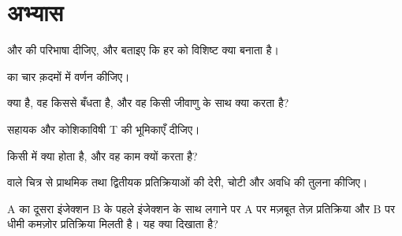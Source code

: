 \section{अभ्यास}

\begin{exercise}[$\star$]\label{exo:g12:adaptive-immunity:1}
 और  की परिभाषा दीजिए, और बताइए कि हर  को विशिष्ट क्या
बनाता है।
\end{exercise}

\begin{exercise}[$\star$]\label{exo:g12:adaptive-immunity:2}
 का चार क़दमों में वर्णन कीजिए।
\end{exercise}

\begin{exercise}[$\star$]\label{exo:g12:adaptive-immunity:3}
 क्या है, वह किससे बँधता है, और वह किसी जीवाणु के साथ क्या करता
है?
\end{exercise}

\begin{exercise}[$\star$]\label{exo:g12:adaptive-immunity:4}
सहायक और कोशिकाविषी T  की भूमिकाएँ दीजिए।
\end{exercise}

\begin{exercise}[$\star$]\label{exo:g12:adaptive-immunity:5}
किसी  में क्या होता है, और वह काम क्यों करता है?
\end{exercise}

\begin{exercise}[$\star\star$]\label{exo:g12:adaptive-immunity:6}
 वाले चित्र से प्राथमिक तथा द्वितीयक प्रतिक्रियाओं की देरी, चोटी
और अवधि की तुलना कीजिए।
\end{exercise}

\begin{exercise}[$\star\star$]\label{exo:g12:adaptive-immunity:7}
 A का दूसरा इंजेक्शन  B के पहले इंजेक्शन के साथ लगाने पर A पर
मज़बूत तेज़ प्रतिक्रिया और B पर धीमी कमज़ोर प्रतिक्रिया मिलती है। यह क्या
दिखाता है?
\end{exercise}

